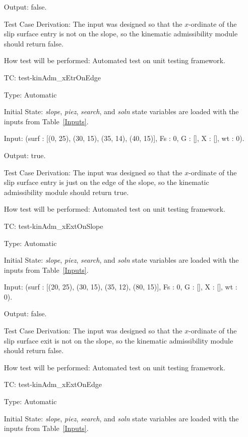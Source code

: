 \documentclass[12pt, titlepage]{article}
\newcounter{utestnum} %
\begin{document}
\begin{enumerate}[label=TC\arabic*:,ref={\arabic*}]
	Output: false.
	
	Test Case Derivation: The input was designed so that the $x$-ordinate of 
	the slip surface entry is not on the slope, so the kinematic admissibility 
	module should return false.
	
	How test will be performed: Automated test on unit testing framework.
	
	\item [TC\refstepcounter{utestnum}\theutestnum: 
	\label{TC_KinAdmXetrOnEdge}] 
	test-kinAdm\_xEtrOnEdge
	
	Type: Automatic
	
	Initial State: \textit{slope}, \textit{piez}, \textit{search}, and 
	\textit{soln} state variables are loaded with the inputs from 
	Table~\ref{Inputs}.
	
	Input: (surf : [(0, 25), (30, 15), (35, 14), (40, 15)], Fs : 0, G : [], X : 
	[], wt : 0).
	
	Output: true.
	
	Test Case Derivation: The input was designed so that the $x$-ordinate of 
	the slip surface entry is just on the edge of the slope, so the kinematic 
	admissibility module should return true.
	
	How test will be performed: Automated test on unit testing framework.
	
	\item [TC\refstepcounter{utestnum}\theutestnum: 
	\label{TC_KinAdmXextOnSlope}] 
	test-kinAdm\_xExtOnSlope
	
	Type: Automatic
	
	Initial State: \textit{slope}, \textit{piez}, \textit{search}, and 
	\textit{soln} state variables are loaded with the inputs from 
	Table~\ref{Inputs}.
	
	Input: (surf : [(20, 25), (30, 15), (35, 12), (80, 15)], Fs : 0, G : [], X 
	: [], wt : 0).
	
	Output: false.
	
	Test Case Derivation: The input was designed so that the $x$-ordinate of 
	the slip surface exit is not on the slope, so the kinematic admissibility 
	module should return false.
	
	How test will be performed: Automated test on unit testing framework.
	
	\item [TC\refstepcounter{utestnum}\theutestnum: 
	\label{TC_KinAdmXextOnEdge}] 
	test-kinAdm\_xExtOnEdge
	
	Type: Automatic
	
	Initial State: \textit{slope}, \textit{piez}, \textit{search}, and 
	\textit{soln} state variables are loaded with the inputs from 
	Table~\ref{Inputs}.
	

\end{enumerate}
\end{document}
